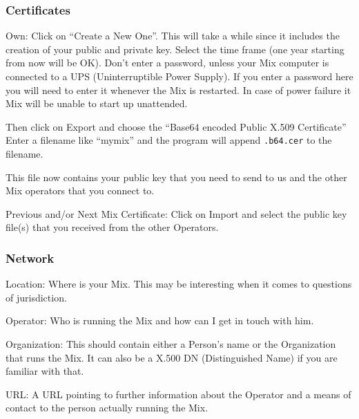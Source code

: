 \documentclass{article}
\begin{document}
\subsubsection{Certificates}

\begin{description}
\item{Own}: Click on ``Create a New One''. This will take a while
  since it includes the creation of your public and private key.
  Select the time frame (one year starting from now will be OK). Don't
  enter a password, unless your Mix computer is connected to a
  UPS (Uninterruptible Power Supply). If you enter a password here you
  will need to enter it whenever the Mix is restarted. In case of
  power failure it Mix will be unable to start up unattended.
  
  Then click on Export and choose the ``Base64 encoded Public X.509
  Certificate'' Enter a filename like ``mymix'' and the program will
  append \verb|.b64.cer| to the filename.
  
  This file now contains your public key that you need to send to
  us and the other Mix operators that you connect to.
  
\item{Previous and/or Next Mix Certificate}: Click on Import and
  select the public key file(s) that you received from the other
  Operators.

\end{description}

\subsubsection{Network}

\begin{description}
\item{Location}: Where is your Mix. This may be interesting when it
  comes to questions of jurisdiction.
\item{Operator}: Who is running the Mix and how can I get in touch with him.
  \begin{description}
  \item{Organization}: This should contain either a Person's name or the
    Organization that runs the Mix. It can also be a X.500 DN
    (Distinguished Name) if you are familiar with that.
  \item{URL}: A URL pointing to further information about the Operator
    and a means of contact to the person actually running the Mix.
  \end{description}
\end{description}
\end{document}
